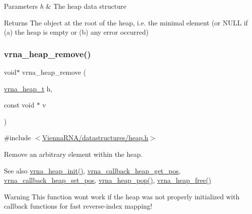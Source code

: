 \begin{DoxyParams}{Parameters}
{\em h} & The heap data structure \\
\hline
\end{DoxyParams}
\begin{DoxyReturn}{Returns}
The object at the root of the heap, i.\+e. the minimal element (or N\+U\+LL if (a) the heap is empty or (b) any error occurred) 
\end{DoxyReturn}
\mbox{\label{group__heap__utils_ga5e181d5ef8557d502943b938620c7174}} 
\subsubsection{\texorpdfstring{vrna\_heap\_remove()}{vrna\_heap\_remove()}}
{\footnotesize\ttfamily void$\ast$ vrna\+\_\+heap\+\_\+remove (\begin{DoxyParamCaption}\item[{\mbox{\hyperlink{group__heap__utils_ga341ea87a651145b986792f6eb3e679c3}{vrna\+\_\+heap\+\_\+t}}}]{h,  }\item[{const void $\ast$}]{v }\end{DoxyParamCaption})}



{\ttfamily \#include $<$\mbox{\hyperlink{heap_8h}{Vienna\+R\+N\+A/datastructures/heap.\+h}}$>$}



Remove an arbitrary element within the heap. 

\begin{DoxySeeAlso}{See also}
\mbox{\hyperlink{group__heap__utils_gafd02db4841338bad6f551e3e2bd2161f}{vrna\+\_\+heap\+\_\+init()}}, \mbox{\hyperlink{group__heap__utils_ga15f9e17d8168f2d7edc43a282ff44f5e}{vrna\+\_\+callback\+\_\+heap\+\_\+get\+\_\+pos}}, \mbox{\hyperlink{group__heap__utils_ga00acf19f3af4792fb2f3b1d01b32fc61}{vrna\+\_\+callback\+\_\+heap\+\_\+set\+\_\+pos}}, \mbox{\hyperlink{group__heap__utils_ga3b6242f3a1194eb1df2d1fb40d630610}{vrna\+\_\+heap\+\_\+pop()}}, \mbox{\hyperlink{group__heap__utils_ga2a4915c6e66b8831644857df0715c3ce}{vrna\+\_\+heap\+\_\+free()}}
\end{DoxySeeAlso}
\begin{DoxyWarning}{Warning}
This function won\textquotesingle{}t work if the heap was not properly initialized with callback functions for fast reverse-\/index mapping!
\end{DoxyWarning}

